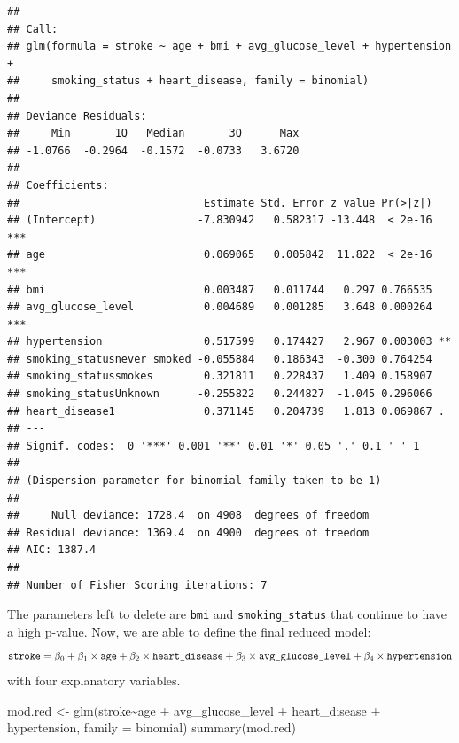 \documentclass[
]{article}
\newenvironment{Shaded}{\begin{snugshade}}{\end{snugshade}}
\newcommand{\AttributeTok}[1]{\textcolor[rgb]{0.77,0.63,0.00}{#1}}
\newcommand{\FunctionTok}[1]{\textcolor[rgb]{0.00,0.00,0.00}{#1}}
\newcommand{\NormalTok}[1]{#1}
\newcommand{\OtherTok}[1]{\textcolor[rgb]{0.56,0.35,0.01}{#1}}
\newcommand{\SpecialCharTok}[1]{\textcolor[rgb]{0.00,0.00,0.00}{#1}}
\begin{document}
\begin{verbatim}
## 
## Call:
## glm(formula = stroke ~ age + bmi + avg_glucose_level + hypertension + 
##     smoking_status + heart_disease, family = binomial)
## 
## Deviance Residuals: 
##     Min       1Q   Median       3Q      Max  
## -1.0766  -0.2964  -0.1572  -0.0733   3.6720  
## 
## Coefficients:
##                             Estimate Std. Error z value Pr(>|z|)    
## (Intercept)                -7.830942   0.582317 -13.448  < 2e-16 ***
## age                         0.069065   0.005842  11.822  < 2e-16 ***
## bmi                         0.003487   0.011744   0.297 0.766535    
## avg_glucose_level           0.004689   0.001285   3.648 0.000264 ***
## hypertension                0.517599   0.174427   2.967 0.003003 ** 
## smoking_statusnever smoked -0.055884   0.186343  -0.300 0.764254    
## smoking_statussmokes        0.321811   0.228437   1.409 0.158907    
## smoking_statusUnknown      -0.255822   0.244827  -1.045 0.296066    
## heart_disease1              0.371145   0.204739   1.813 0.069867 .  
## ---
## Signif. codes:  0 '***' 0.001 '**' 0.01 '*' 0.05 '.' 0.1 ' ' 1
## 
## (Dispersion parameter for binomial family taken to be 1)
## 
##     Null deviance: 1728.4  on 4908  degrees of freedom
## Residual deviance: 1369.4  on 4900  degrees of freedom
## AIC: 1387.4
## 
## Number of Fisher Scoring iterations: 7
\end{verbatim}

The parameters left to delete are \texttt{bmi} and
\texttt{smoking\_status} that continue to have a high p-value. Now, we
are able to define the final reduced model:
\[\verb|stroke| = \beta_0 + \beta_1\times \verb|age| + \beta_2\times \verb|heart_disease| + \beta_3 \times  \verb|avg_glucose_level| + \beta_4 \times\verb|hypertension|\]
with four explanatory variables.

\begin{Shaded}
\begin{Highlighting}[]
\NormalTok{mod.red }\OtherTok{\textless{}{-}} \FunctionTok{glm}\NormalTok{(stroke}\SpecialCharTok{\textasciitilde{}}\NormalTok{age }\SpecialCharTok{+}\NormalTok{ avg\_glucose\_level }\SpecialCharTok{+}\NormalTok{ heart\_disease }\SpecialCharTok{+}\NormalTok{ hypertension, }
               \AttributeTok{family =}\NormalTok{ binomial)}
\FunctionTok{summary}\NormalTok{(mod.red)}
\end{Highlighting}
\end{Shaded}
\end{document}
